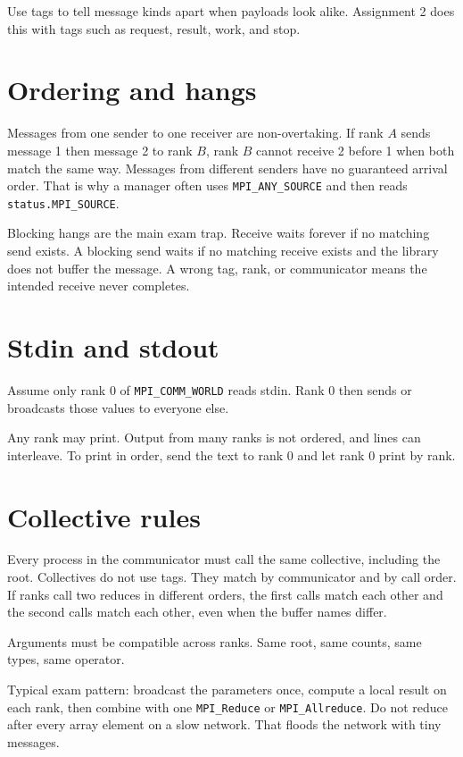 \documentclass[9pt,letterpaper]{extarticle}
\begin{document}
Use tags to tell message kinds apart when payloads look alike. Assignment 2 does this with tags such as request, result, work, and stop.

\section{Ordering and hangs}
Messages from one sender to one receiver are non-overtaking. If rank $A$ sends message 1 then message 2 to rank $B$, rank $B$ cannot receive 2 before 1 when both match the same way. Messages from different senders have no guaranteed arrival order. That is why a manager often uses \texttt{MPI\_ANY\_SOURCE} and then reads \texttt{status.MPI\_SOURCE}.

Blocking hangs are the main exam trap. Receive waits forever if no matching send exists. A blocking send waits if no matching receive exists and the library does not buffer the message. A wrong tag, rank, or communicator means the intended receive never completes.

\section{Stdin and stdout}
Assume only rank 0 of \texttt{MPI\_COMM\_WORLD} reads stdin. Rank 0 then sends or broadcasts those values to everyone else.

Any rank may print. Output from many ranks is not ordered, and lines can interleave. To print in order, send the text to rank 0 and let rank 0 print by rank.

\newpage

\section{Collective rules}
Every process in the communicator must call the same collective, including the root. Collectives do not use tags. They match by communicator and by call order. If ranks call two reduces in different orders, the first calls match each other and the second calls match each other, even when the buffer names differ.

Arguments must be compatible across ranks. Same root, same counts, same types, same operator.

Typical exam pattern: broadcast the parameters once, compute a local result on each rank, then combine with one \texttt{MPI\_Reduce} or \texttt{MPI\_Allreduce}. Do not reduce after every array element on a slow network. That floods the network with tiny messages.
\end{document}
